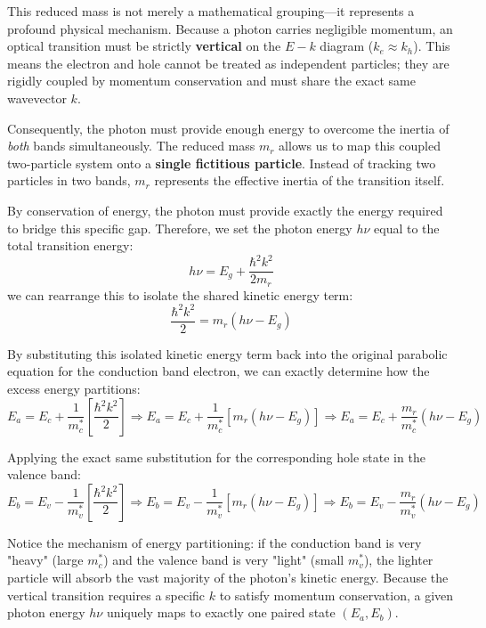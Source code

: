This reduced mass is not merely a mathematical grouping—it represents a profound physical mechanism. Because a photon carries negligible momentum, an optical transition must be strictly \textbf{vertical} on the $E-k$ diagram ($k_e \approx k_h$). This means the electron and hole cannot be treated as independent particles; they are rigidly coupled by momentum conservation and must share the exact same wavevector $k$. 

Consequently, the photon must provide enough energy to overcome the inertia of \textit{both} bands simultaneously. The reduced mass $m_r$ allows us to map this coupled two-particle system onto a \textbf{single fictitious particle}. Instead of tracking two particles in two bands, $m_r$ represents the effective inertia of the transition itself.

By conservation of energy, the photon must provide exactly the energy required to bridge this specific gap. Therefore, we set the photon energy $h\nu$ equal to the total transition energy:
\begin{equation*}
    h\nu = E_g + \frac{\hbar^2 k^2}{2m_r}
\end{equation*}
we can rearrange this to isolate the shared kinetic energy term:
\begin{equation*}
    \frac{\hbar^2 k^2}{2} = m_r(h\nu - E_g)
\end{equation*}

By substituting this isolated kinetic energy term back into the original parabolic equation for the conduction band electron, we can exactly determine how the excess energy partitions:
\begin{equation*}
    E_a = E_c + \frac{1}{m_c^*}\left[\frac{\hbar^2 k^2}{2}\right] \Rightarrow E_a = E_c + \frac{1}{m_c^*}\left[m_r(h\nu - E_g)\right] \Rightarrow E_a = E_c + \frac{m_r}{m_c^*}(h\nu - E_g)
\end{equation*}

Applying the exact same substitution for the corresponding hole state in the valence band:
\begin{equation*}
    E_b = E_v - \frac{1}{m_v^*}\left[\frac{\hbar^2 k^2}{2}\right] \Rightarrow E_b = E_v - \frac{1}{m_v^*}\left[m_r(h\nu - E_g)\right] \Rightarrow E_b = E_v - \frac{m_r}{m_v^*}(h\nu - E_g)
\end{equation*}

Notice the mechanism of energy partitioning: if the conduction band is very "heavy" (large $m_c^*$) and the valence band is very "light" (small $m_v^*$), the lighter particle will absorb the vast majority of the photon's kinetic energy. Because the vertical transition requires a specific $k$ to satisfy momentum conservation, a given photon energy $h\nu$ uniquely maps to exactly one paired state $(E_a, E_b)$.

